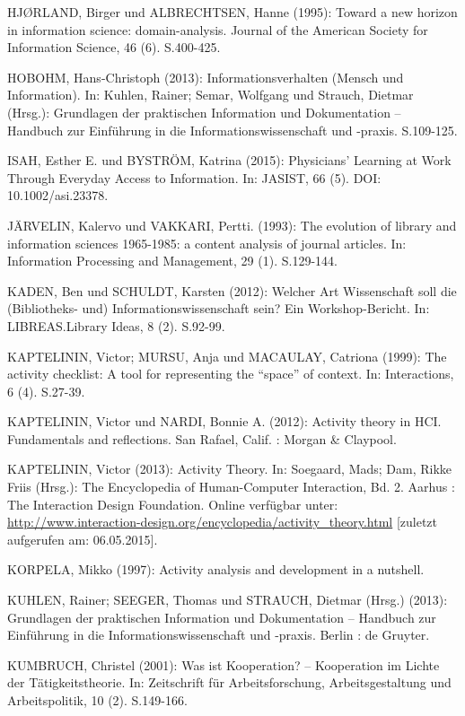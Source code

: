 \documentclass[a4paper,
fontsize=11pt,
oneside,
numbers=noperiodatend,
parskip=half-,
bibliography=totoc,
final
]{scrartcl}
\begin{document}
HJØRLAND, Birger und ALBRECHTSEN, Hanne (1995): Toward a new horizon in
information science: domain-analysis. Journal of the American Society
for Information Science, 46 (6). S.400-425.

HOBOHM, Hans-Christoph (2013): Informationsverhalten (Mensch und
Information). In: Kuhlen, Rainer; Semar, Wolfgang und Strauch, Dietmar
(Hrsg.): Grundlagen der praktischen Information und Dokumentation --
Handbuch zur Einführung in die Informationswissenschaft und -praxis.
S.109-125.

ISAH, Esther E. und BYSTRÖM, Katrina (2015): Physicians' Learning at
Work Through Everyday Access to Information. In: JASIST, 66 (5). DOI:
10.1002/asi.23378.

JÄRVELIN, Kalervo und VAKKARI, Pertti. (1993): The evolution of library
and information sciences 1965-1985: a content analysis of journal
articles. In: Information Processing and Management, 29 (1). S.129-144.

KADEN, Ben und SCHULDT, Karsten (2012): Welcher Art Wissenschaft soll
die (Bibliotheks- und) Informationswissenschaft sein? Ein
Workshop-Bericht. In: LIBREAS.Library Ideas, 8 (2). S.92-99.

KAPTELININ, Victor; MURSU, Anja und MACAULAY, Catriona (1999): The
activity checklist: A tool for representing the \enquote{space} of
context. In: Interactions, 6 (4). S.27-39.

KAPTELININ, Victor und NARDI, Bonnie A. (2012): Activity theory in HCI.
Fundamentals and reflections. San Rafael, Calif. : Morgan \& Claypool.

KAPTELININ, Victor (2013): Activity Theory. In: Soegaard, Mads; Dam,
Rikke Friis (Hrsg.): The Encyclopedia of Human-Computer Interaction, Bd.
2. Aarhus : The Interaction Design Foundation. Online verfügbar unter:
\url{http://www.interaction-design.org/encyclopedia/activity_theory.html}
{[}zuletzt aufgerufen am: 06.05.2015{]}.

KORPELA, Mikko (1997): Activity analysis and development in a nutshell.

KUHLEN, Rainer; SEEGER, Thomas und STRAUCH, Dietmar (Hrsg.) (2013):
Grundlagen der praktischen Information und Dokumentation -- Handbuch zur
Einführung in die Informationswissenschaft und -praxis. Berlin : de
Gruyter.

KUMBRUCH, Christel (2001): Was ist Kooperation? -- Kooperation im Lichte
der Tätigkeitstheorie. In: Zeitschrift für Arbeitsforschung,
Arbeitsgestaltung und Arbeitspolitik, 10 (2). S.149-166.
\end{document}
